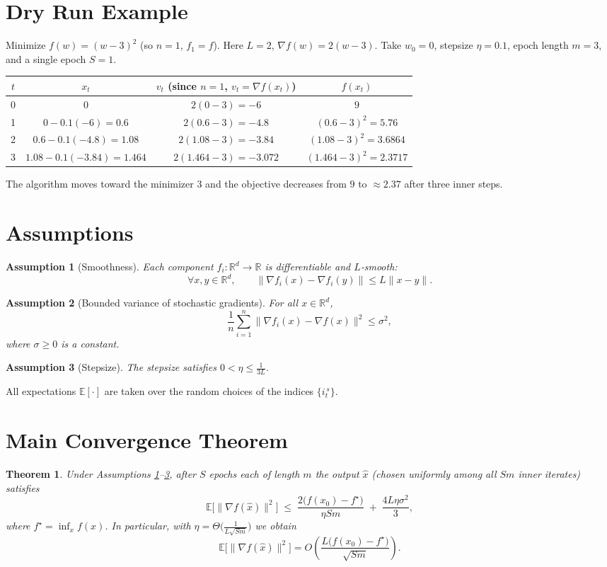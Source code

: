 \documentclass{article}
\newtheorem{theorem}{Theorem}
\newtheorem{assumption}{Assumption}
\newcommand{\E}{\mathbb{E}}
\newcommand{\R}{\mathbb{R}}
\begin{document}
\section*{Dry Run Example}
Minimize $f(w)=(w-3)^2$ (so $n=1$, $f_1=f$).  Here $L=2$, $\nabla f(w)=2(w-3)$.  
Take $w_0=0$, stepsize $\eta=0.1$, epoch length $m=3$, and a single epoch $S=1$.

\begin{center}
\begin{tabular}{c|c|c|c}
$t$ & $x_t$ & $v_t$ (since $n=1$, $v_t=\nabla f(x_t)$) & $f(x_t)$\\ \hline
0 & $0$ & $2(0-3)=-6$ & $9$\\
1 & $0-0.1(-6)=0.6$ & $2(0.6-3)=-4.8$ & $(0.6-3)^2=5.76$\\
2 & $0.6-0.1(-4.8)=1.08$ & $2(1.08-3)=-3.84$ & $(1.08-3)^2=3.6864$\\
3 & $1.08-0.1(-3.84)=1.464$ & $2(1.464-3)=-3.072$ & $(1.464-3)^2=2.3717$
\end{tabular}
\end{center}
The algorithm moves toward the minimizer $3$ and the objective decreases from $9$ to $\approx2.37$ after three inner steps.

\section*{Assumptions}
\begin{assumption}[Smoothness]\label{ass:smooth}
Each component $f_i:\R^d\to\R$ is differentiable and $L$‑smooth:
\[
\forall x,y\in\R^d,\qquad
\|\nabla f_i(x)-\nabla f_i(y)\|\le L\|x-y\|.
\]
\end{assumption}
\begin{assumption}[Bounded variance of stochastic gradients]\label{ass:var}
For all $x\in\R^d$,
\[
\frac{1}{n}\sum_{i=1}^{n}\|\nabla f_i(x)-\nabla f(x)\|^{2}\le\sigma^{2},
\]
where $\sigma\ge0$ is a constant.
\end{assumption}
\begin{assumption}[Stepsize]\label{ass:eta}
The stepsize satisfies $0<\eta\le \frac{1}{3L}$.
\end{assumption}
All expectations $\E[\cdot]$ are taken over the random choices of the indices $\{i_t^{\,s}\}$.

\section*{Main Convergence Theorem}
\begin{theorem}\label{thm:main}
Under Assumptions \ref{ass:smooth}–\ref{ass:eta}, after $S$ epochs each of length $m$ the output $\hat{x}$ (chosen uniformly among all $S m$ inner iterates) satisfies
\[
\E\bigl[\|\nabla f(\hat{x})\|^{2}\bigr]
\;\le\;
\frac{2\bigl(f(x_0)-f^{\star}\bigr)}{\eta S m}
\;+\;
\frac{4L\eta\sigma^{2}}{3},
\]
where $f^{\star}=\inf_{x}f(x)$.  In particular, with $\eta= \Theta\!\bigl(\frac{1}{L\sqrt{S m}}\bigr)$ we obtain
\[
\E\bigl[\|\nabla f(\hat{x})\|^{2}\bigr]=O\!\left(\frac{L\bigl(f(x_0)-f^{\star}\bigr)}{\sqrt{S m}}\right).
\]
\end{theorem}
\end{document}
